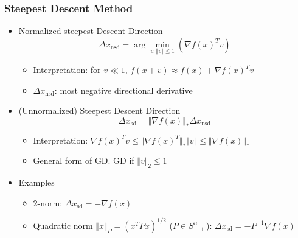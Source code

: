 \subsubsection*{Steepest Descent Method}
\begin{itemize}
    \item Normalized steepest Descent Direction
        $$ \Delta x_\mathrm{nsd}=\arg\min_{v:\Vert v\Vert\leq 1} \left(\nabla f(x)^T v\right) $$
    \begin{itemize}
        \item Interpretation: for $v\ll 1$, $f(x+v)\approx f(x)+\nabla f(x)^T v$
        \item $\Delta x_{\mathrm{nsd}}$: most negative directional derivative
    \end{itemize}
    \item (Unnormalized) Steepest Descent Direction
        $$ \Delta x_\mathrm{sd}=\Vert\nabla f(x)\Vert_\ast\Delta x_\mathrm{nsd} $$
    \begin{itemize}
        \item Interpretation: $\nabla f(x)^Tv\leq\Vert\nabla f(x)^T\Vert_\ast\Vert v\Vert\leq\Vert\nabla f(x)\Vert_\ast$
        \item General form of GD. GD if $\Vert v\Vert_2\leq 1$
    \end{itemize}
    \item Examples
    \begin{itemize}
        \item 2-norm: $\Delta x_\mathrm{sd} = -\nabla f(x)$
        \item Quadratic norm $\Vert x\Vert_P=(x^TPx)^{1/2}$ ($P\in S_{++}^n$): $\Delta x_\mathrm{sd}=-P^{-1}\nabla f(x)$
    \end{itemize}
\end{itemize}


